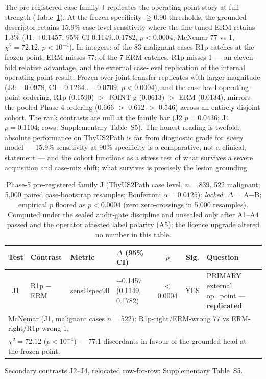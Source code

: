 \documentclass[jimh,article,submit,moreauthors,pdftex]{Definitions/tsp}
\newcommand{\lgShrink}[1]{{\scriptsize #1}}
\begin{document}
The pre-registered case family J replicates the operating-point story
at full strength (Table~\ref{tab:phase5_familyj}). At the frozen
specificity-$\geq$0.90 thresholds, the grounded descriptor retains
15.9\% case-level sensitivity where the fine-tuned ERM retains 1.3\%
(J1: $+0.1457$, 95\% CI 0.1149..0.1782, $p{<}0.0004$; McNemar 77 vs 1,
$\chi^2 = 72.12$, $p < 10^{-4}$). In integers: of the 83 malignant
cases R1p catches at the frozen point, ERM misses 77; of the 7 ERM
catches, R1p misses 1 --- an eleven-fold relative advantage, and the
external case-level replication of the internal operating-point result.
Frozen-over-joint transfer replicates with larger magnitude (J3:
$-0.0978$, CI $-0.1264..-0.0709$, $p{<}0.0004$), and the case-level
operating-point ordering, R1p (0.1590) $>$ JOINT-g (0.0613) $>$ ERM
(0.0134), mirrors the pooled Phase-4 ordering (0.666 $>$ 0.612 $>$
0.546) across an entirely disjoint cohort. The rank contrasts are null
at the family bar (J2 $p{=}0.0436$; J4 $p{=}0.1104$; rows:
Supplementary Table~S5). The honest reading is twofold: absolute
performance on ThyUS2Path is far from diagnostic grade for
\emph{every} model --- 15.9\% sensitivity at 90\% specificity is a
comparative, not a clinical, statement --- and the cohort functions as
a stress test of what survives a severe acquisition and case-mix
shift; what survives is precisely the lesion grounding.

\begin{table}[!ht]
\centering\small
\caption{Phase-5 pre-registered family J (ThyUS2Path case level,
$n{=}839$, 522 malignant; 5{,}000 paired case-bootstrap resamples;
Bonferroni $\alpha{=}0.0125$): \emph{locked}. $\Delta$ = A$-$B; empirical
$p$ floored as $p{<}0.0004$ (zero zero-crossings in 5{,}000 resamples).
Computed under the sealed audit-gate discipline and unsealed only after
A1--A4 passed and the operator attested label polarity (A5); the licence
upgrade altered no number in this table.}
\label{tab:phase5_familyj}
\lgShrink{%
\begin{tabular}{clllccl}
\toprule
Test & Contrast & Metric & $\Delta$ (95\% CI) & $p$ & Sig. & Question \\
\midrule
J1 & R1p $-$ ERM      & sens@spec90 & +0.1457 (0.1149, 0.1782)     & $<$0.0004 & YES & PRIMARY external op.\ point --- \textbf{replicated} \\
\multicolumn{7}{l}{McNemar (J1, malignant cases $n{=}522$): R1p-right/ERM-wrong 77 vs ERM-right/R1p-wrong 1,}\\
\multicolumn{7}{l}{$\chi^2 = 72.12$ ($p < 10^{-4}$) --- 77:1 discordants in favour of the grounded head at the frozen point.}\\
\bottomrule
\end{tabular}%
}

{\footnotesize Secondary contrasts J2--J4, relocated row-for-row: Supplementary Table~S5.}
\end{table}
\end{document}
